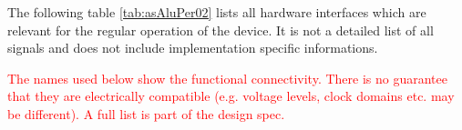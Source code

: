 The following table \ref{tab:asAluPer02} lists all hardware interfaces which are relevant for the regular operation of the device. It is not a detailed list of all signals and does not include implementation specific informations.

\textcolor{red}{The names used below show the functional connectivity. There is no guarantee that they are electrically compatible (e.g. voltage levels, clock domains etc. may be different). A full list is part of the design spec.}
